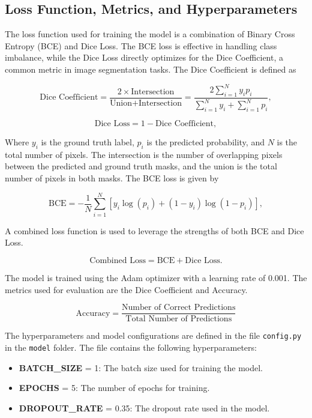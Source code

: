 \documentclass{article}
\begin{document}
\subsection{Loss Function, Metrics, and Hyperparameters}

The loss function used for training the model is a combination of Binary Cross Entropy (BCE) and Dice Loss.
The BCE loss is effective in handling class imbalance, while the Dice Loss directly optimizes for the Dice
Coefficient, a common metric in image segmentation tasks. The Dice Coefficient is defined as

\[
\text{Dice Coefficient} = \frac{2 \times \text{Intersection}}{\text{Union} + \text{Intersection}} = 
\frac{2 \sum_{i=1}^{N} y_i p_i}{\sum_{i=1}^{N} y_i + \sum_{i=1}^{N} p_i},
\]

\[
\text{Dice Loss} = 1 - \text{Dice Coefficient},
\]

Where \( y_i \) is the ground truth label, \( p_i \) is the predicted probability, and \( N \) is the total 
number of pixels. The intersection is the number of overlapping pixels between the predicted and ground truth 
masks, and the union is the total number of pixels in both masks. The BCE loss is given by

\[
\text{BCE} = -\frac{1}{N} \sum_{i=1}^{N} [y_i \log(p_i) + (1 - y_i) \log(1 - p_i)],
\]

A combined loss function is used to leverage the strengths of both BCE and Dice Loss.

\[
\text{Combined Loss} = \text{BCE} + \text{Dice Loss}.
\]

The model is trained using the Adam optimizer with a learning rate of 0.001. The metrics used for evaluation 
are the Dice Coefficient and Accuracy.

\[
\text{Accuracy} = \frac{\text{Number of Correct Predictions}}{\text{Total Number of Predictions}}
\]
\vspace{1em}

The hyperparameters and model configurations are defined in the file \texttt{config.py} in the \texttt{model} folder.
The file contains the following hyperparameters:
 
\begin{itemize}
    \item \textbf{BATCH\_SIZE} = 1: The batch size used for training the model.
    \item \textbf{EPOCHS} = 5: The number of epochs for training.
    \item \textbf{DROPOUT\_RATE} = 0.35: The dropout rate used in the model.
\end{itemize}
\end{document}
